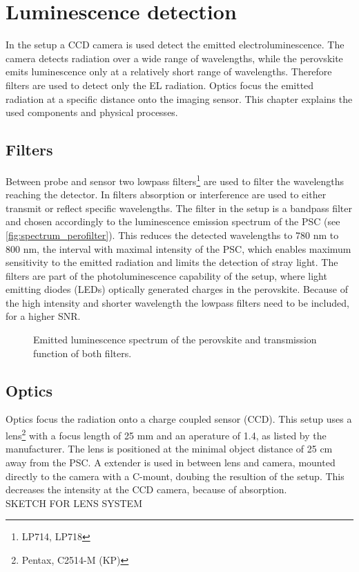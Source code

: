 \section{Luminescence detection}\label{sec:luminescencedetection}
In the setup a CCD camera is used detect the emitted electroluminescence. The camera detects radiation over a wide range of wavelengths, while the perovskite emits luminescence only at a relatively short range of wavelengths. Therefore filters are used to detect only the EL radiation. Optics focus the emitted radiation at a specific distance onto the imaging sensor. This chapter explains the used components and physical processes.
\subsection{Filters}
Between probe and sensor two lowpass filters\footnote{LP714, LP718} are used to filter the wavelengths reaching the detector. In filters absorption or interference are used to either transmit or reflect specific wavelengths. The filter in the setup is a bandpass filter and chosen accordingly to the luminescence emission spectrum of the PSC (see \autoref{fig:spectrum_perofilter}). This reduces the detected wavelengths to 780 nm to 800 nm, the interval with maximal intensity of the PSC, which enables maximum sensitivity to the emitted radiation and limits the detection of stray light. The filters are part of the photoluminescence capability of the setup, where light emitting diodes (LEDs) optically generated charges in the perovskite. Because of the high intensity and shorter wavelength the lowpass filters need to be included, for a higher SNR. %

\begin{figure}[h]
	\centering
	
	\caption{Emitted luminescence spectrum of the perovskite and transmission function of both filters. }
	\label{fig:spectrum_perofilter}
\end{figure}
\subsection{Optics}
Optics focus the radiation onto a charge coupled sensor (CCD). This setup uses a lens\footnote{Pentax, C2514-M (KP)} with a focus length of 25 mm and an aperature of 1.4, as listed by the manufacturer. The lens is positioned at the minimal object distance of  25 cm away from the PSC. A extender is used in between lens and camera, mounted directly to the camera with a C-mount, doubing the resultion of the setup. This decreases the intensity at the CCD camera, because of absorption.
\\
SKETCH FOR LENS SYSTEM
\\


